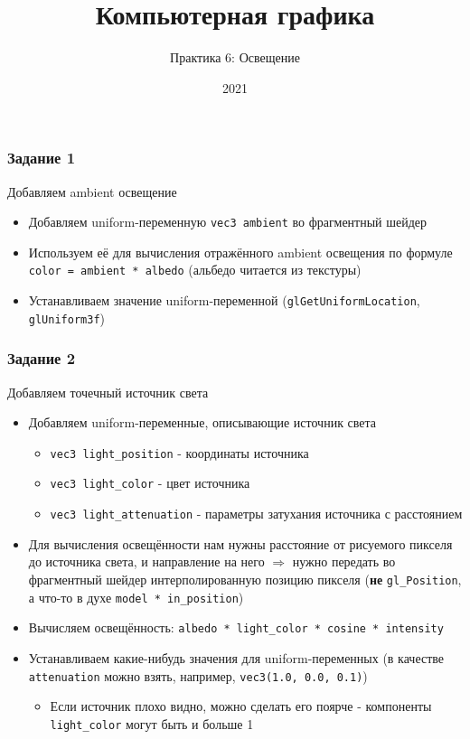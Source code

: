 \documentclass{beamer}
\title{Компьютерная графика}
\subtitle{Практика 6: Освещение}
\date{2021}
\begin{document}
\frame{\titlepage}

\begin{frame}[fragile]
\frametitle{Задание 1}
Добавляем ambient освещение
\begin{itemize}
\item Добавляем uniform-переменную \verb|vec3 ambient| во фрагментный шейдер
\pause
\item Используем её для вычисления отражённого ambient освещения по формуле \verb|color = ambient * albedo| (альбедо читается из текстуры)
\pause
\item Устанавливаем значение uniform-переменной (\verb|glGetUniformLocation|, \verb|glUniform3f|)
\end{itemize}
\end{frame}

\begin{frame}[fragile]
\frametitle{Задание 2}
Добавляем точечный источник света
\begin{itemize}
\item Добавляем uniform-переменные, описывающие источник света
\begin{itemize}
\item \verb|vec3 light_position| - координаты источника
\item \verb|vec3 light_color| - цвет источника
\item \verb|vec3 light_attenuation| - параметры затухания источника с расстоянием
\end{itemize}
\pause
\item Для вычисления освещённости нам нужны расстояние от рисуемого пикселя до источника света, и направление на него \begin{math}\Rightarrow\end{math} нужно передать во фрагментный шейдер интерполированную позицию пикселя (\textbf{не} \verb|gl_Position|, а что-то в духе \verb|model * in_position|)
\pause
\item Вычисляем освещённость: \verb|albedo * light_color * cosine * intensity|
\pause
\item Устанавливаем какие-нибудь значения для uniform-переменных (в качестве \verb|attenuation| можно взять, например, \verb|vec3(1.0, 0.0, 0.1)|)
\begin{itemize}
\item Если источник плохо видно, можно сделать его поярче - компоненты \verb|light_color| могут быть и больше 1
\end{itemize}
\end{itemize}
\end{frame}
\end{document}
